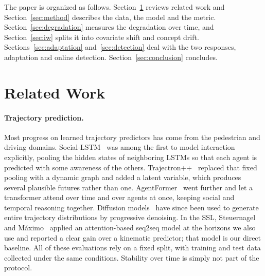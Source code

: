 \documentclass[runningheads]{llncs}
\begin{document}
The paper is organized as follows. Section~\ref{sec:related} reviews related
work and Section~\ref{sec:method} describes the data, the model and the metric.
Section~\ref{sec:degradation} measures the degradation over time, and
Section~\ref{sec:iw} splits it into covariate shift and concept drift.
Sections~\ref{sec:adaptation} and~\ref{sec:detection} deal with the two
responses, adaptation and online detection. Section~\ref{sec:conclusion}
concludes.

\section{Related Work}
\label{sec:related}

\paragraph{Trajectory prediction.}
Most progress on learned trajectory predictors has come from the pedestrian and
driving domains. Social-LSTM~\cite{alahi2016} was among the first to model
interaction explicitly, pooling the hidden states of neighboring LSTMs so that
each agent is predicted with some awareness of the others.
Trajectron++~\cite{salzmann2020} replaced that fixed pooling with a dynamic
graph and added a latent variable, which produces several plausible futures
rather than one. AgentFormer~\cite{yuan2021} went further and let a transformer
attend over time and over agents at once, keeping social and temporal reasoning
together. Diffusion models~\cite{gu2022} have since been used to generate entire
trajectory distributions by progressive denoising. In the SSL, Steuernagel and
M\'aximo~\cite{seq2seq} applied an attention-based seq2seq model at the horizons
we also use and reported a clear gain over a kinematic predictor; that model is
our direct baseline. All of these evaluations rely on a fixed split, with
training and test data collected under the same conditions. Stability over time
is simply not part of the protocol.
\end{document}
